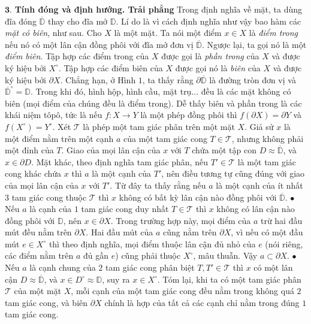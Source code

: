 \begin{multicols}{2}
	\vskip 0.1cm
	$\pmb{3.}$ \textbf{\color{duongvaotoanhoc}Tính đóng và định hướng. Trải phẳng}
	\vskip 0.1cm
	Trong định nghĩa về mặt, ta dùng đĩa đóng $\overline{\mathbb{D}}$ thay cho đĩa mở $\mathbb{D}$. Lí do là vì cách định nghĩa như vậy bao hàm các {\it mặt có biên}, như sau. Cho $X$ là một mặt. Ta nói một điểm $x \in X$ là {\it điểm trong} nếu nó có một lân cận đồng phôi với đĩa mở đơn vị $\overline{\mathbb{D}}$. Ngược lại, ta gọi nó là một {\it điểm biên}. Tập hợp các điểm trong của $X$ được gọi là {\it phần trong} của $X$ và được ký hiệu bởi $X^\circ$. Tập hợp các điểm biên của $X$ được gọi nó là {\it biên} của $X$ và được ký hiệu bởi $\partial X$. 
	\vskip 0.1cm
	Chẳng hạn, ở Hình $1$, ta thấy rằng $\partial \overline{\mathbb{D}}$ là đường tròn đơn vị và $\overline{\mathbb{D}}^\circ = \mathbb{D}$. Trong khi đó, hình hộp, hình cầu, mặt trụ... đều là các mặt không có biên (mọi điểm của chúng đều là điểm trong). Dễ thấy biên và phần trong là các khái niệm tôpô, tức là nếu $f: X \to Y$ là một phép đồng phôi thì $f(\partial X) = \partial Y$ và $f(X^\circ) = Y^\circ$.
	\vskip 0.1cm
	Xét $\mathscr{T}$ là phép một tam giác phân trên một mặt $X$. Giả sử $x$ là một điểm nằm trên một cạnh $a$ của một tam giác cong $T \in \mathscr{T}$, nhưng không phải một đỉnh của $T$. Giao của mọi lân cận của $x$ với $T$ chứa một tập con $D \approx \overline{\mathbb{D}}$, và $x \in \partial D$. Mặt khác, theo định nghĩa tam giác phân, nếu $T' \in \mathscr{T}$ là một tam giác cong khác chứa $x$ thì $a$ là một cạnh của $T'$, nên điều tương tự cũng đúng với giao của mọi lân cận của $x$ với $T'$. Từ đây ta thấy rằng nếu $a$ là một cạnh của ít nhất $3$ tam giác cong thuộc $\mathscr{T}$ thì $x$ không có bất kỳ lân cận nào đồng phôi với $\overline{\mathbb{D}}$. 
	\vskip 0.1cm
	$\bullet$ Nếu $a$ là cạnh của $1$ tam giác cong duy nhất $T \in \mathscr{T}$ thì $x$ không có lân cận nào đồng phôi với $\mathbb{D}$, nên $x \in \partial X$. Trong trường hợp này, mọi điểm của $a$ trừ hai đầu mút đều nằm trên $\partial X$. Hai đầu mút của $a$ cũng nằm trên $\partial X$, vì nếu có một đầu mút $e \in X^\circ$ thì theo định nghĩa, mọi điểm thuộc lân cận đủ nhỏ của $e$ (nói riêng, các điểm nằm trên $a$ đủ gần $e$) cũng phải thuộc $X^\circ$, mâu thuẫn. Vậy $a \subset \partial X$.
	\vskip 0.1cm	
	$\bullet$ Nếu $a$ là cạnh chung của $2$ tam giác cong phân biệt $T,T' \in \mathscr{T}$ thì $x$ có một lân cận $D \approx \overline{\mathbb{D}}$, và $x \in D^\circ \approx \mathbb{D}$, suy ra $x \in X^\circ$.
	\vskip 0.1cm
	Tóm lại, khi ta có một tam giác phân $\mathscr{T}$ của một mặt $X$, mỗi cạnh của một tam giác cong đều nằm trong không quá $2$ tam giác cong, và biên $\partial X$ chính là hợp của tất cả các cạnh chỉ nằm trong đúng $1$ tam giác cong.

\end{multicols}
